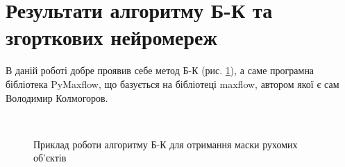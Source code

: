 \section{Результати алгоритму Б-К та згорткових нейромереж}

В даній роботі добре проявив себе метод Б-К (рис. \ref{fig:bk_examples}),
а саме програмна бібліотека PyMaxflow,
що базується на бібліотеці maxflow, автором якої є сам Володимир Колмогоров.

\begin{figure}[H]
    \centering

    \\
    \caption{Приклад роботи алгоритму Б-К для отримання маски рухомих об'єктів
        \label{fig:bk_examples}
    }
\end{figure}

